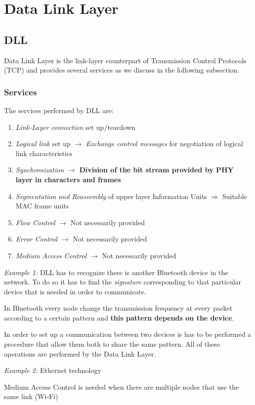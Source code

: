 \chapter{Data Link Layer}
\section{DLL}
Data Link Layer is the link-layer counterpart of Transmission Control Protocols (TCP) and provides several services as we discuss in the following subsection.
\subsection{Services}
The services performed by DLL are:
\begin{enumerate}
\item \textit{Link-Layer connection} set up/teardown
\item \textit{Logical link} set up $\rightarrow$ \textit{Exchange control messages} for negotiation of logical link characteristics
\item \emph{Synchronization} $\rightarrow$ \textbf{Division of the bit stream provided by PHY layer in characters and frames}
\item \emph{Segmentation and Reassembly} of upper layer Information Units $\Rightarrow$ Suitable MAC frame units
\item \textit{Flow Control} $\rightarrow$ Not necessarily provided
\item \textit{Error Control }$\rightarrow$ Not necessarily provided
\item \textit{Medium Access Control} $\rightarrow$ Not necessarily provided
\end{enumerate}

\emph{Example 1:} DLL has to recognize there is another Bluetooth device in the network. To do so it has to find  the \emph{signature} corresponding to that particular device that is needed in order to communicate.

In Bluetooth every node change the transmission frequency at every packet according to a certain pattern and \textbf{this pattern depends on the device}.

In order to set up a communication between two devices is has to be performed a procedure that allow them both to share the same pattern. All of these operations are performed by the Data Link Layer. 

\emph{Example 2:} Ethernet technology 

Medium Access Control is needed when there are multiple nodes that use the same link (Wi-Fi)

